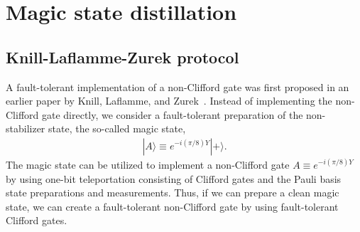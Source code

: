 \section{Magic state distillation}
\label{sec:magic}
\subsection{Knill-Laflamme-Zurek protocol}
A fault-tolerant implementation of a non-Clifford gate was first proposed in an earlier paper by Knill, Laflamme, and Zurek~\cite{Knill98a,Knill98b}.
Instead of implementing the non-Clifford gate directly, we consider a fault-tolerant preparation of the non-stabilizer state, the so-called magic state,
\begin{eqnarray}
|A \rangle \equiv e^{ - i (\pi /8 ) Y }| +\rangle.
\end{eqnarray}
The magic state can be utilized to implement a non-Clifford gate $A \equiv e^{- i (\pi /8) Y}$ by using one-bit teleportation consisting of Clifford gates and the Pauli basis state preparations and measurements.
Thus, if we can prepare a clean magic state, we can create a fault-tolerant non-Clifford gate by using fault-tolerant Clifford gates.

